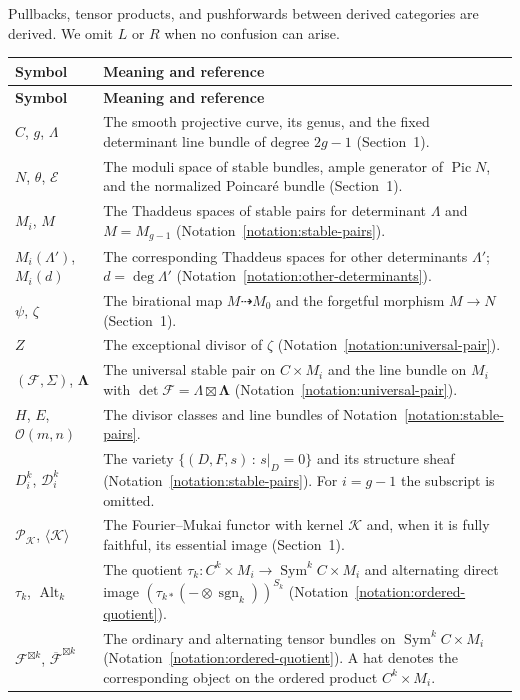 \documentclass[11pt,letterpaper]{amsart}
\theoremstyle{plain}
\theoremstyle{definition}
\theoremstyle{remark}
\numberwithin{equation}{section}
\DeclareMathOperator{\Pic}{Pic}
\DeclareMathOperator{\Sym}{Sym}
\begin{document}
Pullbacks, tensor products, and pushforwards between derived categories
are derived.  We omit $L$ or $R$ when no confusion can arise.  

\begin{longtable}{@{}p{}p{}@{}}
\toprule
\textbf{Symbol} & \textbf{Meaning and reference}\\
\midrule
\endfirsthead
\toprule
\textbf{Symbol} & \textbf{Meaning and reference}\\
\midrule
\endhead
$C$, $g$, $\Lambda$ & The smooth projective curve, its genus, and the
fixed determinant line bundle of degree $2g-1$ (Section~1).\\[2pt]
$N$, $\theta$, $\mathcal E$ & The moduli space of stable bundles, 
ample generator of $\Pic N$, and the normalized Poincar\'e bundle
(Section~1).\\[2pt]
$M_i$, $M$ & The Thaddeus spaces of stable pairs for determinant $\Lambda$ and
$M=M_{g-1}$ (Notation~\ref{notation:stable-pairs}).\\[2pt]
$M_i(\Lambda')$, $M_i(d)$ & The corresponding Thaddeus spaces for other
determinants $\Lambda'$; $d=\deg\Lambda'$ (Notation~\ref{notation:other-determinants}).\\[2pt]
$\psi$, $\zeta$ & The birational map $M\dashrightarrow M_0$ and the
forgetful morphism $M\to N$ (Section~1).\\[2pt]
$Z$ & The exceptional divisor
of  $\zeta$ (Notation~\ref{notation:universal-pair}).\\[2pt]
$(\mathcal F,\Sigma)$, $\boldsymbol\Lambda$ & The universal stable pair on $C\times M_i$
and the line bundle on $M_i$ with
$\det\mathcal F=\Lambda\boxtimes\boldsymbol\Lambda$
(Notation~\ref{notation:universal-pair}).  
\\[2pt]
$H$, $E$, $\mathcal O(m,n)$ & The divisor classes and line bundles of
Notation~\ref{notation:stable-pairs}.\\[2pt]
$D_i^k$, $\mathcal D_i^k$ & The  variety $\{(D,F,s)\,:\,s|_D=0\}$ and its structure
sheaf (Notation~\ref{notation:stable-pairs}).  For $i=g-1$ the subscript
is omitted.\\[2pt]
$\mathcal P_{\mathcal K}$, $\langle\mathcal K\rangle$ & The
Fourier--Mukai functor with kernel $\mathcal K$ and, when it is fully
faithful, its essential image (Section~1).\\[2pt]
$\tau_k$, $\operatorname{Alt}_k$ & The  quotient $\tau_k:C^k\times M_i\to\Sym^kC\times M_i$ and alternating
direct image  $(\tau_{k*}(-\otimes\operatorname{sgn}_k))^{S_k}$ (Notation~\ref{notation:ordered-quotient}).\\[2pt]
$\mathcal F^{\boxtimes k}$,
$\overline{\mathcal F}^{\boxtimes k}$ & The ordinary and alternating
tensor bundles on $\Sym^kC\times M_i$ (Notation~\ref{notation:ordered-quotient}).  A hat denotes
the corresponding object on the ordered product $C^k\times M_i$.\\[2pt]


\end{longtable}
\end{document}
